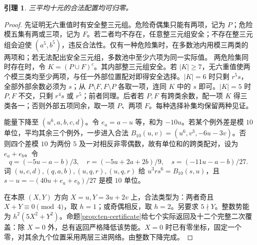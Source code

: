 \documentclass[11pt,a4paper]{article}
\newtheorem{lemma}[theorem]{引理}
\theoremstyle{definition}
\numberwithin{equation}{section}
\begin{document}
\begin{lemma}\label{lem:ten}
三平均十元的合法配置均可归零。
\end{lemma}
\begin{proof}
先证明无六重值时有安全整三元组。危险奇偶集只能有两项，记为 $P$；危险模五集有两或三项，记为 $F$。若二者均不存在，任意整三元组安全；不存在整三元组会迫使 $(a^5,b^5)$，违反合法性。仅有一种危险集时，在多数池内用模三两类的两项和；若无法配出安全三元组，多数池中至少六项为同一实际值。
两危险集同时存在时，令 $K=(P\cup F)^c$。其内部整三元组安全。若 $|K|\ge7$，无六重值使两个模三类均至少两项，与任一外部位置配对即得安全选择。$|K|=6$ 时只剩 $r^5s$，全部外部余数必须为 $s$；从 $P\setminus F,F\setminus P$ 各取一项，连同 $K$ 中的 $s$ 即可。$|K|=5$ 时 $P,F$ 不交，只剩 $r^4s$ 或 $r^5$；前者同理。后者若 $P,F$ 有跨类余数，配一项 $K$ 得三类各一；否则外部五项同余，取一项 $P$、两项 $F$。每种选择补集均保留两种见证。

能量下降至 $(u^6,a,b,c,d)$。令 $e_a=a-u$ 等，和为 $-10u$。若某个例外差是模 $10$ 单位，平均其余三个例外，一步进入合法 $B_{10}(u,v)=(u^6,v^3,-6u-3v)$。否则四个差模 $10$ 为两份 $5$ 及一对相反非零偶数，故有单位和的跨类配对，设为 $e_a+e_b$。令
\[q=(-5u-a-b)/3,\quad r=(-5u+2a+2b)/9,\quad s=(-11u-a-b)/27.
\]
词 $(u,c,d),(q,a,b),(u,q,r),(u,q,r)$ 给 $u^3r s^6=B_{10}(s,u)$，且 $s-u=-(40u+e_a+e_b)/27$ 是模 $10$ 单位。

在本原 $(X,Y)$ 方向 $X=u,Y=3u+2v$ 上，合法类型为：两者奇且 $X+Y\equiv0\pmod4$，取 $h=1$；或奇偶相反，取 $h=2$。另要求 $5\nmid Y$。整数势能为 $h^2(5X^2+Y^2)$。命题\ref{prop:ten-certificate}给七个实际返回及十二个完整二次覆盖：除 $X=0$ 外，总有返回严格降低该势能。$X=0$ 时已有零坐标，固定一个零，对其余九个位置采用两层三进网络。由整数下降完成。
\end{proof}
\end{document}
